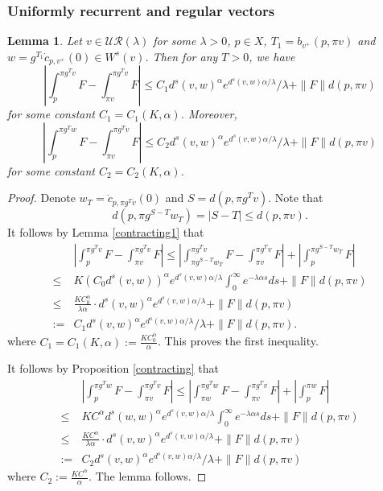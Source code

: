 \documentclass[11pt]{amsart}
\newtheorem{lemma}[theorem]{Lemma}
\theoremstyle{definition}
\newcommand{\UR}{\mathcal{UR}}
\def\a{\alpha}
\def\l{\lambda}   \def\L{\Lambda}
\begin{document}
\subsubsection{Uniformly recurrent and regular vectors}
\begin{lemma}\label{Bowen}
Let $v\in \UR(\lambda)$ for some $\l>0$,  $p\in X$, $T_1=b_{v^+}(p, \pi v)$ and $w=g^{T_1}\dot c_{p,v^+}(0)\in W^s(v)$. Then for any $T>0$, we have
$$\left|\int_p^{\pi g^Tv}F-\int_{\pi v}^{\pi g^Tv}F\right|\le C_1d^s(v,w)^\a  e^{d^s(v,w)\a/\lambda}/\l+\|F\|d(p,\pi v)$$
for some constant $C_1=C_1(K,\a)$. Moreover, 
$$\left|\int_p^{\pi g^Tw}F-\int_{\pi v}^{\pi g^Tv}F\right|\le C_2d^s(v,w)^\a  e^{d^s(v,w)\a/\lambda}/\l+\|F\|d(p,\pi v)$$
for some constant $C_2=C_2(K,\a)$.

\end{lemma}
\begin{proof}
Denote $w_T=\dot c_{p,\pi g^Tv}(0)$ and $S=d(p,\pi g^Tv)$. Note that
$$d(p,\pi g^{S-T}w_T)=|S-T|\le d(p,\pi v).$$
It follows by Lemma \ref{contracting1} that
\begin{equation*}
\begin{aligned}
&\left|\int_p^{\pi g^Tv}F-\int_{\pi v}^{\pi g^Tv}F\right|\le \left|\int_{\pi g^{S-T}w_T}^{\pi g^Tv}F-\int_{\pi v}^{\pi g^Tv}F\right|
+\left|\int_p^{\pi g^{S-T}w_T}F\right|\\
\le &K(C_0d^s(v,w))^\a e^{d^s(v,w)\a/\lambda}\int_0^\infty e^{-\lambda\a s}ds+\|F\|d(p,\pi v)\\
\le &\frac{KC_0^\a}{\lambda\a}\cdot d^s(v,w)^\a  e^{d^s(v,w)\a/\lambda}+\|F\|d(p,\pi v)\\
:=&C_1d^s(v,w)^\a  e^{d^s(v,w)\a/\lambda}/\l+\|F\|d(p,\pi v).
\end{aligned}
\end{equation*}
where $C_1=C_1(K,\a):=\frac{KC_0^\a}{\a}$. This proves the first inequality. 

It follows by Proposition \ref{contracting} that
\begin{equation*}
\begin{aligned}
&\left|\int_p^{\pi g^Tw}F-\int_{\pi v}^{\pi g^Tv}F\right|\le \left|\int_{\pi w}^{\pi g^Tw}F-\int_{\pi v}^{\pi g^Tv}F\right|
+\left|\int_p^{\pi w}F\right|\\
\le &KC^\a d^s(w,w)^\a e^{d^s(v,w)\a/\lambda}\int_0^\infty e^{-\lambda\a s}ds+\|F\|d(p,\pi v)\\
\le &\frac{KC^\a}{\lambda\a}\cdot d^s(v,w)^\a e^{d^s(v,w)\a/\lambda}+\|F\|d(p,\pi v)\\
:=&C_2d^s(v,w)^\a e^{d^s(v,w)\a/\lambda}/\l+\|F\|d(p,\pi v)
\end{aligned}
\end{equation*}
where $C_2:=\frac{KC^\a}{\a}$. The lemma follows.
\end{proof}
\end{document}

